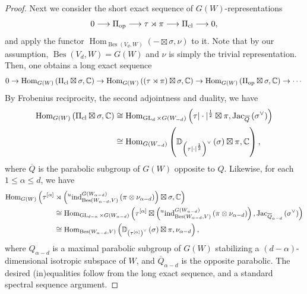 \documentclass[11pt,letterpaper]{amsart}
\theoremstyle{plain}
\numberwithin{theorem}{section}
\numberwithin{equation}{subsection}
\theoremstyle{remark}
\newcommand{\Hom}{\operatorname{Hom}}
\newcommand{\GL}{\operatorname{GL}}
\newcommand{\ind}{\operatorname{ind}}
\newcommand{\Jac}{\operatorname{Jac}}
\newcommand{\Bes}{\operatorname{Bes}} %
\newcommand{\C}{\mathbb{C}}
\newcommand{\D}{\mathbb{D}}
\def\ra{\rightarrow}
\def\lra{\longrightarrow}
\begin{document}
\begin{proof}
\vskip 5pt

Next we consider the short exact sequence of $G\left(W\right)$-representations
\[
    0 \lra \Pi_{\rm op} \lra \tau\rtimes \pi \lra \Pi_{\rm cl} \lra 0,
\]
and apply the functor $\Hom_{\Bes\left(V_d,W\right)}\left(-\boxtimes \sigma, \nu\right)$ to it. Note that by our assumption, $\Bes\left(V_d,W\right) = G\left(W\right)$ and $\nu$ is simply the trivial representation. Then, one obtains a long exact sequence
\[
    0\ra \Hom_{G\left(W\right)}\left(\Pi_{\rm cl}\boxtimes \sigma, \C\right) \ra \Hom_{G\left(W\right)}\left(\left(\tau\rtimes \pi\right)\boxtimes \sigma, \C\right) \ra \Hom_{G\left(W\right)}\left(\Pi_{\rm op}\boxtimes \sigma, \C\right) \ra \cdots
\]
By Frobenius reciprocity, the second adjointness and duality, we have
\begin{align*}
\Hom_{G\left(W\right)}\left(\Pi_{\rm cl}\boxtimes \sigma, \C\right) &\cong \Hom_{\GL_d\times G\left(W_{-d}\right)}\left(\tau|\cdot|^{\frac{1}{2}}\boxtimes \pi, \Jac_{\overline{Q}}\left(\sigma^\vee\right)\right)\\
& \cong \Hom_{G(W_{-d})}\left(\D_{\left(\tau|\cdot|^{\frac{1}{2}}\right)^\vee}\left(\sigma\right)\boxtimes \pi,\C\right),
\end{align*}
where $\overline{Q}$ is the parabolic subgroup of $G\left(W\right)$ opposite to $Q$. Likewise, for each $1\leq\alpha\leq d$, we have 
\begin{align*}
\Hom_{G\left(W\right)}\Big(\tau^{[\alpha]} &\rtimes \left(\prescript{u}{}{\ind}_{\Bes(W_{\alpha-d},V)}^{G(W_{\alpha-d})} \left(\pi\otimes \nu_{\alpha-d}\right)\right)\boxtimes \sigma, \C\Big) \\
&\cong \Hom_{\GL_{d-\alpha}\times G\left(W_{\alpha-d}\right)}\left(\tau^{[\alpha]} \boxtimes \left(\prescript{u}{}{\ind}_{\Bes(W_{\alpha-d},V)}^{G(W_{\alpha-d})} \left(\pi\otimes \nu_{\alpha-d}\right)\right), \Jac_{\overline{Q}_{\alpha-d}}\left(\sigma^\vee\right)\right)\\
& \cong \Hom_{\Bes(W_{\alpha-d},V)}\left(\D_{\left(\tau^{[\alpha]}\right)^\vee}\left(\sigma\right)\boxtimes \pi,\nu_{\alpha-d}\right),
\end{align*}
where $Q_{\alpha-d}$ is a maximal parabolic subgroup of $G\left(W\right)$ stabilizing a $(d-\alpha)$-dimensional isotropic subspace of $W$, and $\overline{Q}_{\alpha-d}$ is the opposite parabolic. The desired (in)equalities follow from the long exact sequence, and a standard spectral sequence argument.

\end{proof}
\end{document}
